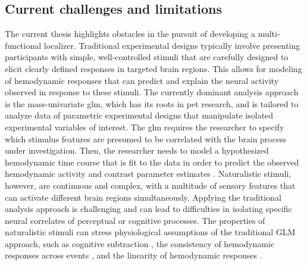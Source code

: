 \subsection{Current challenges and limitations}

%
The current thesis highlights obstacles in the pursuit of developing a
multi-functional localizer.
%
Traditional experimental designs typically involve presenting participants with
simple, well-controlled stimuli that are carefully designed to elicit clearly
defined responses in targeted brain regions.
%
This allows for modeling of hemodynamic responses that can predict and explain
the neural activity observed in response to these stimuli.
%
The currently dominant analysis approach is the mass-univariate \ac{glm}, which
has its roots in \ac{pet} research, and is tailored to analyze data of
parametric experimental designs that manipulate isolated experimental variables
of interest.
%
The \ac{glm} requires the researcher to specify which stimulus features are
presumed to be correlated with the brain process under investigation.
%
Then, the researcher needs to model a hypothesized hemodynamic time course that
is fit to the data in order to predict the observed hemodynamic activity and
contrast parameter estimates \citep{friston1998event}.
%
Naturalistic stimuli, however, are continuous and complex, with a multitude of
sensory features that can activate different brain regions simultaneously.
%
Applying the traditional analysis approach is challenging and can lead to
difficulties in isolating specific neural correlates of perceptual or cognitive
processes.
%
The properties of naturalistic stimuli can stress physiological assumptions of
the traditional GLM approach, such as cognitive subtraction
\citep{friston1996trouble}, the consistency of hemodynamic responses across
events \citep[the rationale behind \textit{trial-averaging};
cf.][]{dale1997selective}, and the linearity of hemodynamic responses
\citep{cohen1997parametric, boynton1996linear, dale1999optimal}.  

